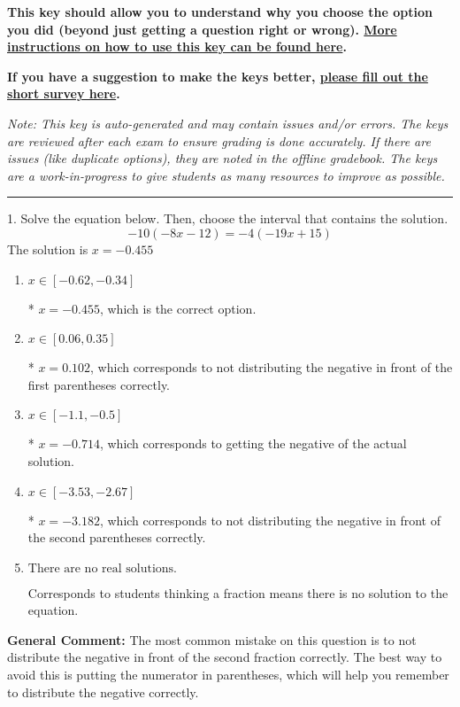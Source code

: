 \documentclass{extbook}[14pt]
\begin{document}
\textbf{This key should allow you to understand why you choose the option you did (beyond just getting a question right or wrong). \href{https://xronos.clas.ufl.edu/mac1105spring2020/courseDescriptionAndMisc/Exams/LearningFromResults}{More instructions on how to use this key can be found here}.}

\textbf{If you have a suggestion to make the keys better, \href{https://forms.gle/CZkbZmPbC9XALEE88}{please fill out the short survey here}.}

\textit{Note: This key is auto-generated and may contain issues and/or errors. The keys are reviewed after each exam to ensure grading is done accurately. If there are issues (like duplicate options), they are noted in the offline gradebook. The keys are a work-in-progress to give students as many resources to improve as possible.}

\rule{\textwidth}{0.4pt}

1. Solve the equation below. Then, choose the interval that contains the solution.
\[ -10(-8x -12) = -4(-19x + 15) \] 
The solution is $ x = -0.455 $ 

\begin{enumerate}[label=\Alph*.] 
\item $ x \in [-0.62, -0.34] $ 

 * $x = -0.455$, which is the correct option. 
\item $ x \in [0.06, 0.35] $ 

 * $x = 0.102$, which corresponds to not distributing the negative in front of the first parentheses correctly. 
\item $ x \in [-1.1, -0.5] $ 

 * $x = -0.714$, which corresponds to getting the negative of the actual solution. 
\item $ x \in [-3.53, -2.67] $ 

 * $x = -3.182$, which corresponds to not distributing the negative in front of the second parentheses correctly. 
\item $ \text{There are no real solutions.} $ 

 Corresponds to students thinking a fraction means there is no solution to the equation. 
\end{enumerate} 
 
\textbf{General Comment:} The most common mistake on this question is to not distribute the negative in front of the second fraction correctly. The best way to avoid this is putting the numerator in parentheses, which will help you remember to distribute the negative correctly. 
\end{document}
